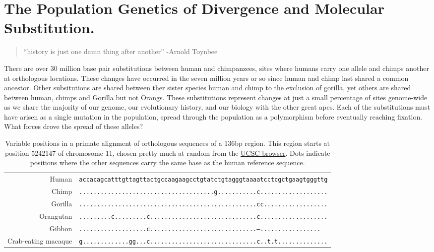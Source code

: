 
\chapter{The Population Genetics of Divergence and Molecular Substitution.}
\begin{quote}
``history is just one damn thing after another'' -Arnold Toynbee
\end{quote} %


There are over $30$ million base pair substitutions between human and chimpanzees,
sites where humans carry one allele and chimps another at orthologous locations. These changes
have occurred in the seven million years or so since human and chimp
last shared a common ancestor. Other subsitutions are shared between
ther sister species human and chimp to the exclusion of gorilla, yet
others are shared between human, chimps and Gorilla but not Orangs. These substitutions represent changes
at just a small percentage of sites genome-wide as we share the majority of our
genome, our evolutionary history, and our biology with the
other great apes. Each of the substitutions must have arisen as a single mutation in the
population, spread through the population as a polymorphism before
eventually reaching fixation. What forces drove the spread of these
alleles?
\begin{table}
\small{
  \begin{tabular}{rl}
Human & \texttt{accacagcatttgttagttactgccaagaagcctgtatctgtagggtaaaatcctcgctgaagtgggttg}\\
Chimp & \texttt{......................................g...........c...................}\\
Gorilla & \texttt{..................................................cc..................}\\
Orangutan & \texttt{.........c.........c..............................c...................}\\
Gibbon & \texttt{...................c..............................---.................}\\
Crab-eating macaque & \texttt{g.............gg...c..............................c..t.t..............}\\
  \end{tabular}
  }
\caption{Variable positions in a primate alignment of orthologous sequences
  of a 136bp region. This region starts at position 5242147 of
  chromosome 11, chosen pretty much at random from the \href{https://genome.ucsc.edu/cgi-bin/hgc?hgsid=751620175_qgtFpsA9hP8yVBVZ1ezZl3Iy3N1L\&c=chr17\&l=43084819\&r=43084957\&o=43084819\&t=43084957\&g=multiz30way\&i=multiz30way}{UCSC browser}. Dots indicate
  positions where the other sequences carry the same base as the human
reference sequence. } 
\end{table}
